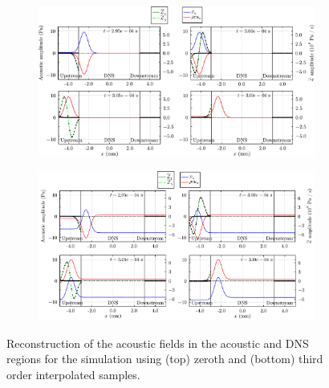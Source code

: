\begin{figure}[t]
\begin{subfigure}{0.99\textwidth}
\centering
\includegraphics[scale=0.33]{assets/graphs/ac_frames_order=0.pdf}
\caption{}
\label{fig:ac-reconstruct_order0}
\end{subfigure}

\vspace{0.5em}

\begin{subfigure}{0.99\textwidth}
\centering
\includegraphics[scale=0.33]{assets/graphs/ac_frames.pdf}
\caption{}
\label{fig:ac-reconstruct_order3}
\end{subfigure}
\caption{Reconstruction of the acoustic fields in the acoustic and DNS regions for the simulation using (top) zeroth and (bottom) third order interpolated samples.}
\label{fig:ac-reconstruct}
\end{figure}

